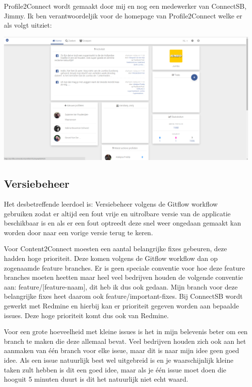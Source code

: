 \newline

Profile2Connect wordt gemaakt door mij en nog een medewerker van ConnectSB, Jimmy. Ik ben verantwoordeljik voor de homepage van Profile2Connect welke er als volgt uitziet:

\includegraphics[scale=0.2]{profile2connect}


\subsection{Versiebeheer}
Het desbetreffende leerdoel is: Versiebeheer volgens de Gitflow workflow gebruiken zodat er altijd een fout vrije en uitrolbare versie van de applicatie beschikbaar is en als er een fout optreedt deze snel weer ongedaan gemaakt kan worden door naar een vorige versie terug te keren.

\newline

Voor Content2Connect moesten een aantal belangrijke fixes gebeuren, deze hadden hoge prioriteit. Deze komen volgens de Gitflow workflow dan op zogenaamde feature branches. Er is geen speciale conventie voor hoe deze feature branches moeten heetten maar heel veel bedrijven houden de volgende conventie aan: feature/[feature-naam], dit heb ik dus ook gedaan. Mijn branch voor deze belangrijke fixes heet daarom ook feature/important-fixes. Bij ConnectSB wordt gewerkt met Redmine en hierbij kan er prioriteit gegeven worden aan bepaalde issues. Deze hoge prioriteit komt dus ook van Redmine.

Voor een grote hoeveelheid met kleine issues is het in mijn belevenis beter om een branch te maken die deze allemaal bevat. Veel bedrijven houden zich ook aan het aanmaken van één branch voor elke issue, maar dit is naar mijn idee geen goed idee. Als een issue natuurlijk best wel uitgebreid is en je waarschijnlijk kleine taken zult hebben is dit een goed idee, maar als je één issue moet doen die hooguit 5 minuten duurt is dit het natuurlijk niet echt waard.

